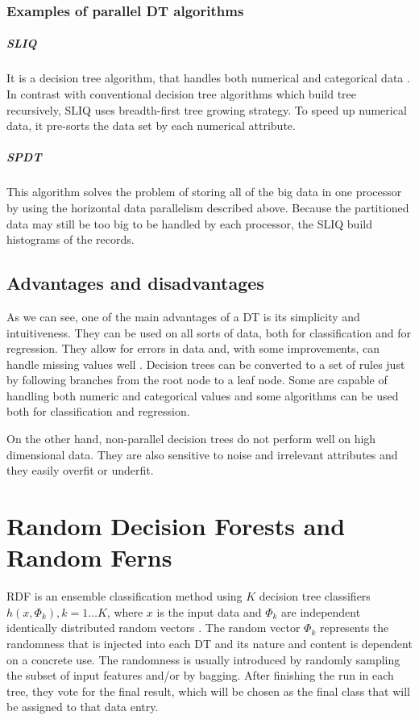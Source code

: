 \documentclass[thesis=B,english]{FITthesis}[2012/10/20]
\begin{document}
		\subsection{Examples of parallel DT algorithms}
			\paragraph*{SLIQ} It is a decision tree algorithm, that handles both numerical and categorical data \cite{mehta1996sliq}. In contrast with conventional decision tree algorithms which build tree recursively, SLIQ uses breadth-first tree growing strategy. To speed up numerical data, it pre-sorts the data set by each numerical attribute. 
			\paragraph*{SPDT}
			This algorithm solves the problem of storing all of the big data in one processor by using the horizontal data parallelism described above. Because the partitioned data may still be too big to be handled by each processor, the SLIQ build histograms of the records.

		\section{Advantages and disadvantages}
		As we can see, one of the main advantages of a DT is its simplicity and intuitiveness. They can be used on all sorts of data, both for classification and for regression. They allow for errors in data and, with some improvements, can handle missing values well \cite{DMWithDecisionTrees,CMP07}. Decision trees can be converted to a set of rules just by following branches from the root node to a leaf node. Some are capable of handling both numeric and categorical values and some algorithms can be used both for classification and regression.

		On the other hand, non-parallel decision trees do not perform well on high dimensional data. They are also sensitive to noise and irrelevant attributes and they easily overfit or underfit.
\chapter{Random Decision Forests and Random Ferns}
\label{chap:RDF}
	RDF is an ensemble classification method using \(K\) decision tree classifiers \({h(x, \Phi_k), k = 1\dots K} \), where \(x\) is the input data and \({\Phi_k}\) are independent identically distributed random vectors \cite{SELECTION_OF_DT}. The random vector \(\Phi_k\) represents the randomness that is injected into each DT and its nature and content is dependent on a concrete use. The randomness is usually introduced by randomly sampling the subset of input features and/or by bagging. After finishing the run in each tree, they vote for the final result, which will be chosen as the final class that will be assigned to that data entry.
\end{document}
